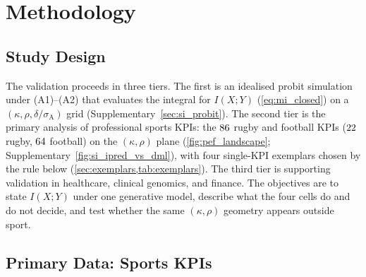 \section{Methodology}
\label{sec:methods}

\subsection{Study Design}

The validation proceeds in three tiers. The first is an idealised probit simulation under (A1)--(A2) that evaluates the integral for $I(X;Y)$ (\cref{eq:mi_closed}) on a $(\kappa,\rho,\delta/\sigma_{\mathrm{A}})$ grid (Supplementary~\cref{sec:si_probit}). The second tier is the primary analysis of professional sports KPIs: the $86{}$ rugby and football KPIs ($22{}$ rugby, $64{}$ football) on the $(\kappa,\rho)$ plane (\cref{fig:pef_landscape}; Supplementary~\cref{fig:si_ipred_vs_dml}), with four single-KPI exemplars chosen by the rule below (\cref{sec:exemplars,tab:exemplars}). The third tier is supporting validation in healthcare, clinical genomics, and finance. The objectives are to state $I(X;Y)$ under one generative model, describe what the four cells do and do not decide, and test whether the same $(\kappa,\rho)$ geometry appears outside sport.

\subsection{Primary Data: Sports KPIs}

